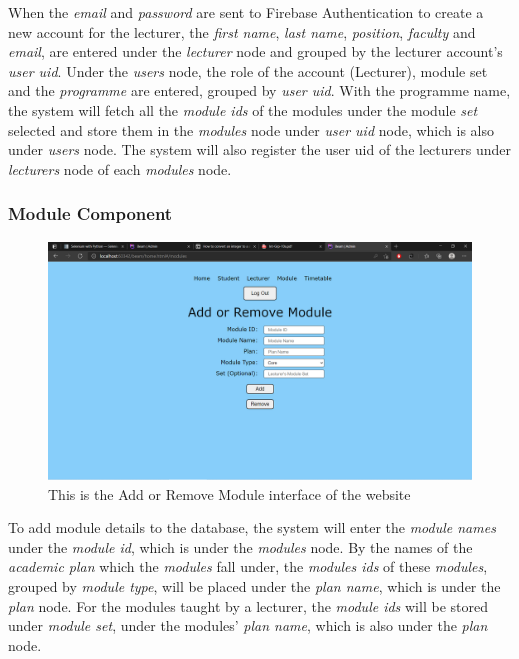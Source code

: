 \documentclass[../report.tex]{subfiles}
\begin{document}


When the \textit{email} and \textit{password} are sent to Firebase Authentication to create a new account for the lecturer, the \textit{first name}, \textit{last name}, \textit{position}, \textit{faculty} and \textit{email}, are entered under the \textit{lecturer} node and grouped by the lecturer account’s \textit{user uid}. Under the \textit{users} node, the role of the account (Lecturer), module set and the \textit{programme} are entered, grouped by \textit{user uid}. With the programme name, the system will fetch all the \textit{module ids} of the modules under the module \textit{set} selected and store them in the \textit{modules} node under \textit{user uid} node, which is also under \textit{users} node. The system will also register the user uid of the lecturers under \textit{lecturers} node of each \textit{modules} node.

\medskip
\subsubsection{Module Component}
\begin{figure}[H]
	\centering
	\includegraphics[width=.7\linewidth]{../images/07/01-05-module.png}
	\caption{This is the Add or Remove Module interface of the website}
	\label{fig:07-01-05-module}
\end{figure}



To add module details to the database, the system will enter the \textit{module names} under the \textit{module id}, which is under the \textit{modules} node. By the names of the \textit{academic plan} which the \textit{modules} fall under, the \textit{modules ids} of these \textit{modules}, grouped by \textit{module type}, will be placed under the \textit{plan name}, which is under the \textit{plan} node. For the modules taught by a lecturer, the \textit{module ids} will be stored under \textit{module set}, under the modules' \textit{plan name}, which is also under the \textit{plan} node.
\end{document}
